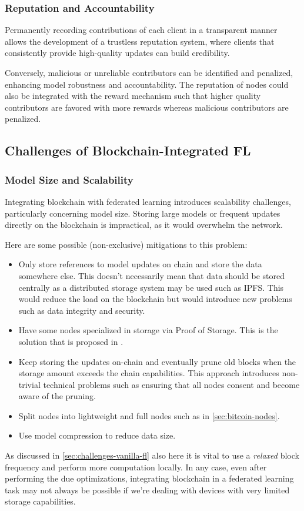 \subsubsection{Reputation and Accountability}
Permanently recording contributions of each client in a transparent manner allows the development of a trustless
reputation system, where clients that consistently provide high-quality updates can build
credibility.

Conversely, malicious or unreliable contributors can be identified and penalized,
enhancing model robustness and accountability.
The reputation of nodes could also be integrated with the reward mechanism such that higher quality contributors
are favored with more rewards whereas malicious contributors are penalized.

\subsection{Challenges of Blockchain-Integrated FL}\label{subsec:challenges-blockchain-fl}
\subsubsection{Model Size and Scalability}
Integrating blockchain with federated learning introduces scalability challenges, particularly
concerning model size. Storing large models or frequent updates directly on the blockchain is
impractical, as it would overwhelm the network.

Here are some possible (non-exclusive) mitigations to this problem:
\begin{itemize}
  \item Only store references to model updates on chain and store the data somewhere else.
    This doesn't necessarily mean that data should be stored centrally as a distributed storage system may be
    used such as IPFS.
    This would reduce the load on the blockchain but would introduce new problems such as data integrity and security.
  \item Have some nodes specialized in storage via Proof of Storage. This is the solution that is proposed in
    \cite{CoinAI}.
  \item Keep storing the updates on-chain and eventually prune old blocks when the storage amount exceeds the
    chain capabilities.
    This approach introduces non-trivial technical problems such as ensuring that all nodes consent and
    become aware of the pruning.
  \item Split nodes into lightweight and full nodes such as in \ref{sec:bitcoin-nodes}.
  \item Use model compression to reduce data size.
\end{itemize}
As discussed in \ref{sec:challenges-vanilla-fl} also here it is vital to use a \textit{relaxed} block
frequency and perform more computation locally.
In any case, even after performing the due optimizations, integrating blockchain in a federated learning task
may not always be possible if we're dealing with devices with very limited storage capabilities.

